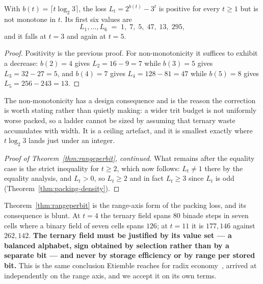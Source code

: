 \begin{theorem}
\label{thm:lossnonmonotone}
With $b(t) = \lceil t \log_2 3\rceil$, the loss $L_t = 2^{b(t)} - 3^{t}$ is
positive for every $t \ge 1$ but is not monotone in $t$. Its first six values are
\[
  L_1,\dots,L_6 \;=\; 1,\; 7,\; 5,\; 47,\; 13,\; 295 ,
\]
and it falls at $t = 3$ and again at $t = 5$.
\end{theorem}

\begin{proof}
Positivity is the previous proof. For non-monotonicity it suffices to exhibit a
decrease: $b(2) = 4$ gives $L_2 = 16 - 9 = 7$ while $b(3) = 5$ gives
$L_3 = 32 - 27 = 5$, and $b(4) = 7$ gives $L_4 = 128 - 81 = 47$ while $b(5) = 8$
gives $L_5 = 256 - 243 = 13$.
\end{proof}

The non-monotonicity has a design consequence and is the reason the correction is
worth stating rather than quietly making: a wider trit budget is not uniformly
worse packed, so a ladder cannot be sized by assuming that ternary waste
accumulates with width. It is a ceiling artefact, and it is smallest exactly where
$t\log_2 3$ lands just under an integer.

\begin{proof}[Proof of Theorem~\ref{thm:rangeperbit}, continued]
What remains after the equality case is the strict inequality for $t \ge 2$, which
now follows: $L_t \ne 1$ there by the equality analysis, and $L_t > 0$, so
$L_t \ge 2$ and in fact $L_t \ge 3$ since $L_t$ is odd
(Theorem~\ref{thm:packing-density}).
\end{proof}

Theorem~\ref{thm:rangeperbit} is the range-axis form of the packing loss, and its
consequence is blunt. At $t = 4$ the ternary field spans $80$ binade steps in
seven cells where a binary field of seven cells spans $126$; at $t = 11$ it is
$177{,}146$ against $262{,}142$. \textbf{The ternary field must be justified by
its value set --- a balanced alphabet, sign obtained by selection rather than by a
separate bit --- and never by storage efficiency or by range per stored bit.}
This is the same conclusion Etiemble reaches for radix
economy~\cite{etiemble2019}, arrived at independently on the range axis,
and we accept it on its own terms.

